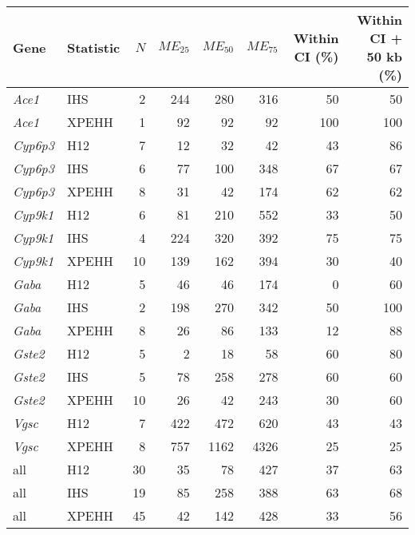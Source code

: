 \begin{tabular}{llrrrrrr}
\toprule
            Gene & Statistic & $N$ & $ME_{25}$ & $ME_{50}$ & $ME_{75}$ & Within CI (\%) & Within CI + 50 kb (\%) \\
\midrule
   \textit{Ace1} &       IHS &   2 &       244 &       280 &       316 &             50 &                     50 \\
   \textit{Ace1} &     XPEHH &   1 &        92 &        92 &        92 &            100 &                    100 \\
 \textit{Cyp6p3} &       H12 &   7 &        12 &        32 &        42 &             43 &                     86 \\
 \textit{Cyp6p3} &       IHS &   6 &        77 &       100 &       348 &             67 &                     67 \\
 \textit{Cyp6p3} &     XPEHH &   8 &        31 &        42 &       174 &             62 &                     62 \\
 \textit{Cyp9k1} &       H12 &   6 &        81 &       210 &       552 &             33 &                     50 \\
 \textit{Cyp9k1} &       IHS &   4 &       224 &       320 &       392 &             75 &                     75 \\
 \textit{Cyp9k1} &     XPEHH &  10 &       139 &       162 &       394 &             30 &                     40 \\
   \textit{Gaba} &       H12 &   5 &        46 &        46 &       174 &              0 &                     60 \\
   \textit{Gaba} &       IHS &   2 &       198 &       270 &       342 &             50 &                    100 \\
   \textit{Gaba} &     XPEHH &   8 &        26 &        86 &       133 &             12 &                     88 \\
  \textit{Gste2} &       H12 &   5 &         2 &        18 &        58 &             60 &                     80 \\
  \textit{Gste2} &       IHS &   5 &        78 &       258 &       278 &             60 &                     60 \\
  \textit{Gste2} &     XPEHH &  10 &        26 &        42 &       243 &             30 &                     60 \\
   \textit{Vgsc} &       H12 &   7 &       422 &       472 &       620 &             43 &                     43 \\
   \textit{Vgsc} &     XPEHH &   8 &       757 &      1162 &      4326 &             25 &                     25 \\
             all &       H12 &  30 &        35 &        78 &       427 &             37 &                     63 \\
             all &       IHS &  19 &        85 &       258 &       388 &             63 &                     68 \\
             all &     XPEHH &  45 &        42 &       142 &       428 &             33 &                     56 \\
\bottomrule
\end{tabular}
